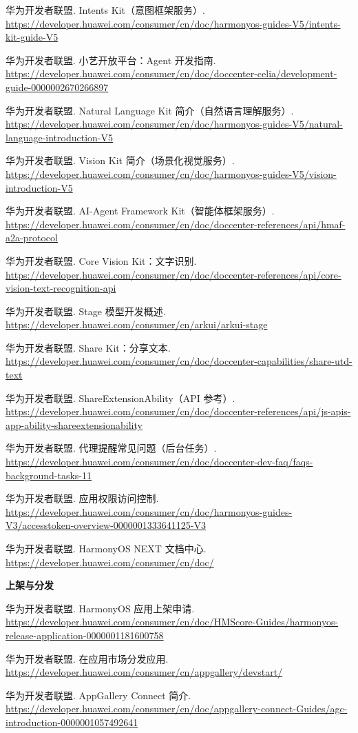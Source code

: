 \documentclass[12pt,a4paper,fontset=windows]{ctexart}
\begin{document}
{\begin{enumerate}[label={[\arabic*]},leftmargin=2.4em,itemsep=1pt,topsep=2pt,parsep=0pt,start=6]
  \item 华为开发者联盟. Intents Kit（意图框架服务）. \url{https://developer.huawei.com/consumer/cn/doc/harmonyos-guides-V5/intents-kit-guide-V5}
  \item 华为开发者联盟. 小艺开放平台：Agent 开发指南. \url{https://developer.huawei.com/consumer/cn/doc/doccenter-celia/development-guide-0000002670266897}
  \item 华为开发者联盟. Natural Language Kit 简介（自然语言理解服务）. \url{https://developer.huawei.com/consumer/cn/doc/harmonyos-guides-V5/natural-language-introduction-V5}
  \item 华为开发者联盟. Vision Kit 简介（场景化视觉服务）. \url{https://developer.huawei.com/consumer/cn/doc/harmonyos-guides-V5/vision-introduction-V5}
  \item 华为开发者联盟. AI-Agent Framework Kit（智能体框架服务）. \url{https://developer.huawei.com/consumer/cn/doc/doccenter-references/api/hmaf-a2a-protocol}
  \item 华为开发者联盟. Core Vision Kit：文字识别. \url{https://developer.huawei.com/consumer/cn/doc/doccenter-references/api/core-vision-text-recognition-api}
  \item 华为开发者联盟. Stage 模型开发概述. \url{https://developer.huawei.com/consumer/cn/arkui/arkui-stage}
  \item 华为开发者联盟. Share Kit：分享文本. \url{https://developer.huawei.com/consumer/cn/doc/doccenter-capabilities/share-utd-text}
  \item 华为开发者联盟. ShareExtensionAbility（API 参考）. \url{https://developer.huawei.com/consumer/cn/doc/doccenter-references/api/js-apis-app-ability-shareextensionability}
  \item 华为开发者联盟. 代理提醒常见问题（后台任务）. \url{https://developer.huawei.com/consumer/cn/doc/doccenter-dev-faq/faqs-background-tasks-11}
  \item 华为开发者联盟. 应用权限访问控制. \url{https://developer.huawei.com/consumer/cn/doc/harmonyos-guides-V3/accesstoken-overview-0000001333641125-V3}
  \item 华为开发者联盟. HarmonyOS NEXT 文档中心. \url{https://developer.huawei.com/consumer/cn/doc/}
\end{enumerate}

\vspace{3pt}
\textbf{上架与分发}

\begin{enumerate}[label={[\arabic*]},leftmargin=2.4em,itemsep=1pt,topsep=2pt,parsep=0pt,start=18]
  \item 华为开发者联盟. HarmonyOS 应用上架申请. \url{https://developer.huawei.com/consumer/cn/doc/HMScore-Guides/harmonyos-release-application-0000001181600758}
  \item 华为开发者联盟. 在应用市场分发应用. \url{https://developer.huawei.com/consumer/cn/appgallery/devstart/}
  \item 华为开发者联盟. AppGallery Connect 简介. \url{https://developer.huawei.com/consumer/cn/doc/appgallery-connect-Guides/agc-introduction-0000001057492641}
\end{enumerate}
}
\end{document}
